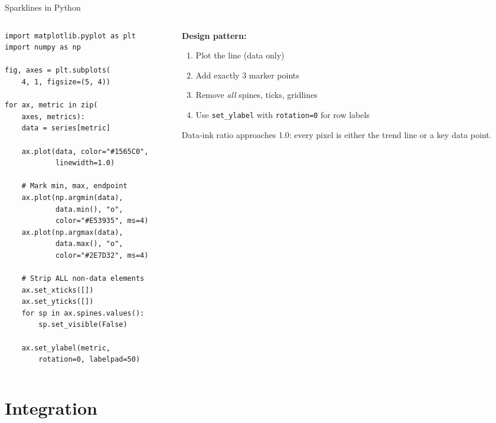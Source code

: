 \documentclass[10pt]{beamer}
\begin{document}
\begin{frame}[fragile]{Sparklines in Python}
  \begin{columns}[T]
    \begin{column}{0.52\textwidth}
\begin{lstlisting}[style=pythonstyle]
import matplotlib.pyplot as plt
import numpy as np

fig, axes = plt.subplots(
    4, 1, figsize=(5, 4))

for ax, metric in zip(
    axes, metrics):
    data = series[metric]

    ax.plot(data, color="#1565C0",
            linewidth=1.0)

    # Mark min, max, endpoint
    ax.plot(np.argmin(data),
            data.min(), "o",
            color="#E53935", ms=4)
    ax.plot(np.argmax(data),
            data.max(), "o",
            color="#2E7D32", ms=4)

    # Strip ALL non-data elements
    ax.set_xticks([])
    ax.set_yticks([])
    for sp in ax.spines.values():
        sp.set_visible(False)

    ax.set_ylabel(metric,
        rotation=0, labelpad=50)
\end{lstlisting}
    \end{column}
    \begin{column}{0.45\textwidth}
      \textbf{Design pattern:}

      \begin{enumerate}
        \item Plot the line (data only)
        \item Add exactly 3 marker points
        \item Remove \emph{all} spines, ticks,
              gridlines
        \item Use \texttt{set\_ylabel} with
              \texttt{rotation=0} for row labels
      \end{enumerate}

      \vspace{4pt}
      {\small Data-ink ratio approaches 1.0:
      every pixel is either the trend line
      or a key data point.}
    \end{column}
  \end{columns}
\end{frame}

\section{Integration}
\end{document}
